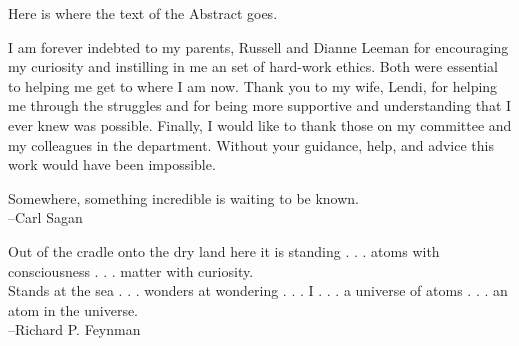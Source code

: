 \documentclass[11pt]{psuthesis}
\begin{document}
\begin{frontmatter}


\begin{doublespace}
\titlepage
\end{doublespace}

\committeepage

\abstract

Here is where the text of the Abstract goes.






\tables


\acknowledgments  

I am forever indebted to my parents, Russell and Dianne Leeman for encouraging my curiosity and instilling in me an set of hard-work ethics. Both were essential to helping me get to where I am now. Thank you to my wife, Lendi, for helping me through the struggles and for being more supportive and understanding that I ever knew was possible. Finally, I would like to thank those on my committee and my colleagues in the department. Without your guidance, help, and advice this work would have been impossible.



\clearpage

\vspace*{2.0truein}

\parbox{4.0truein}{
\par\noindent
Somewhere, something incredible is waiting to be known.\\
\hspace*{\fill}--Carl Sagan
}

\vspace{4pc}

\parbox{4.0truein}{
\par\noindent
Out of the cradle onto the dry land here it is standing . . . atoms with consciousness . . . matter with curiosity.\\
Stands at the sea . . . wonders at wondering . . . I . . . a universe of atoms . . . an atom in the universe.\\
\hspace*{\fill}--Richard P. Feynman
}
\end{frontmatter}
\end{document}
